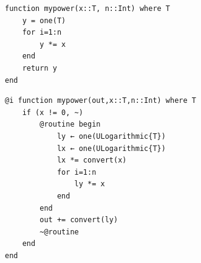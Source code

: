 \documentclass{article}
\newcommand{\<}{\langle}
\renewcommand{\>}{\rangle}
\theoremstyle{definition}\newtheorem{definition}{\textit{Definition}}
\begin{document}
\begin{minipage}{.45\columnwidth}
\begin{lstlisting}[mathescape=true,caption={A regular power function.},label={lst:power1}]
function mypower(x::T, n::Int) where T
    y = one(T)
    for i=1:n
        y *= x
    end
    return y
end
\end{lstlisting}
\end{minipage}\hfill
\begin{minipage}{.45\columnwidth}
\begin{lstlisting}[mathescape=true,caption={A reversible power function.},label={lst:power2}]
@i function mypower(out,x::T,n::Int) where T
    if (x != 0, ~)
        @routine begin
            ly ← one(ULogarithmic{T})
            lx ← one(ULogarithmic{T})
            lx *= convert(x)
            for i=1:n
                ly *= x
            end
        end
        out += convert(ly)
        ~@routine
    end
end
\end{lstlisting}
\end{minipage}
\end{document}
